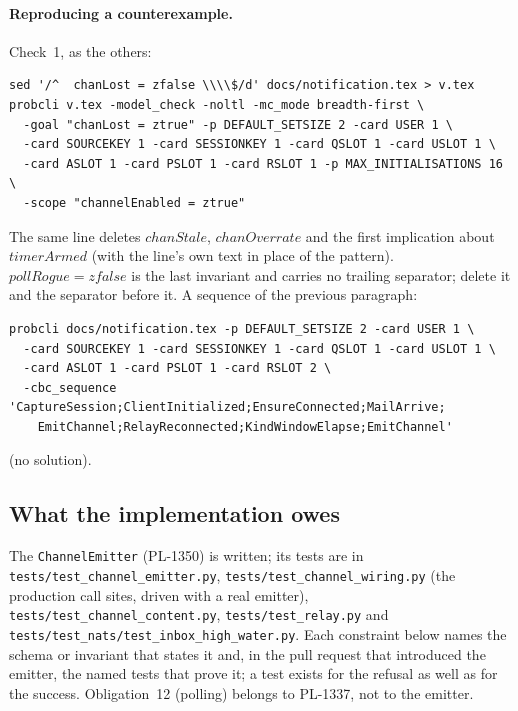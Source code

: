 \documentclass[a4paper,10pt,fleqn]{article}
\begin{document}
\paragraph{Reproducing a counterexample.}  Check~1, as the others:
\begin{verbatim}
sed '/^  chanLost = zfalse \\\\$/d' docs/notification.tex > v.tex
probcli v.tex -model_check -noltl -mc_mode breadth-first \
  -goal "chanLost = ztrue" -p DEFAULT_SETSIZE 2 -card USER 1 \
  -card SOURCEKEY 1 -card SESSIONKEY 1 -card QSLOT 1 -card USLOT 1 \
  -card ASLOT 1 -card PSLOT 1 -card RSLOT 1 -p MAX_INITIALISATIONS 16 \
  -scope "channelEnabled = ztrue"
\end{verbatim}
The same line deletes $chanStale$, $chanOverrate$ and the first implication
about $timerArmed$ (with the line's own text in place of the pattern).
$pollRogue = zfalse$ is the last invariant and carries no trailing
separator; delete it and the separator before it.  A sequence of the
previous paragraph:
\begin{verbatim}
probcli docs/notification.tex -p DEFAULT_SETSIZE 2 -card USER 1 \
  -card SOURCEKEY 1 -card SESSIONKEY 1 -card QSLOT 1 -card USLOT 1 \
  -card ASLOT 1 -card PSLOT 1 -card RSLOT 2 \
  -cbc_sequence 'CaptureSession;ClientInitialized;EnsureConnected;MailArrive;
    EmitChannel;RelayReconnected;KindWindowElapse;EmitChannel'
\end{verbatim}
(no solution).

\subsection{What the implementation owes}
\label{sec:chanobligations}

The \texttt{ChannelEmitter} (PL-1350) is written; its tests are in
\texttt{tests/test\_channel\_emitter.py}, \texttt{tests/test\_channel\_wiring.py}
(the production call sites, driven with a real emitter),
\texttt{tests/test\_channel\_content.py}, \texttt{tests/test\_relay.py} and
\texttt{tests/test\_nats/test\_inbox\_high\_water.py}.  Each constraint below
names the schema or invariant that states it and, in the pull request that
introduced the emitter, the named tests that prove it; a test exists for the
refusal as well as for the success.  Obligation~12 (polling) belongs to
PL-1337, not to the emitter.
\end{document}
